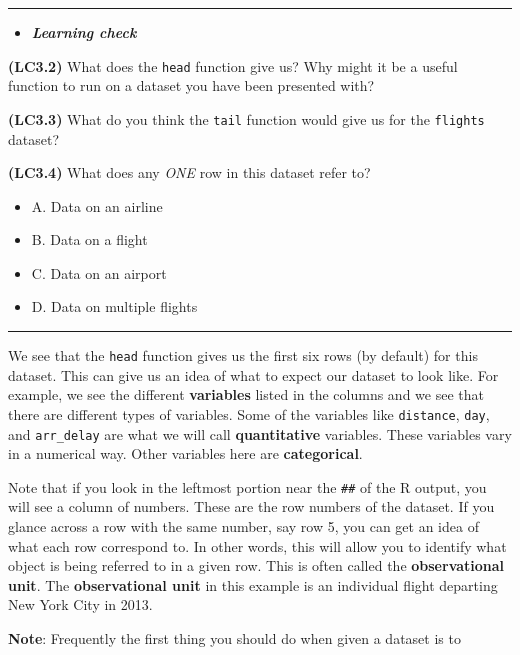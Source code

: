 \documentclass[]{tufte-book}
\providecommand{\tightlist}{%
  \setlength{\itemsep}{0pt}\setlength{\parskip}{0pt}}
\newenvironment{rmdblock}[1]
  {\begin{shaded*}
  \begin{itemize}
  \renewcommand{\labelitemi}{
    \raisebox{-.7\height}[0pt][0pt]{
    }
  }
  \item
  }
  {
  \end{itemize}
  \end{shaded*}
  }
\newenvironment{learncheck}
  {\begin{rmdblock}{warning}}
  {\end{rmdblock}}
\begin{document}
\begin{center}\rule{0.5\linewidth}{\linethickness}\end{center}

\begin{learncheck}
\textbf{\emph{Learning check}}
\end{learncheck}

\textbf{(LC3.2)} What does the \texttt{head} function give us? Why might
it be a useful function to run on a dataset you have been presented
with?

\textbf{(LC3.3)} What do you think the \texttt{tail} function would give
us for the \texttt{flights} dataset?

\textbf{(LC3.4)} What does any \emph{ONE} row in this dataset refer to?

\begin{itemize}
\tightlist
\item
  A. Data on an airline
\item
  B. Data on a flight
\item
  C. Data on an airport
\item
  D. Data on multiple flights
\end{itemize}

\begin{center}\rule{0.5\linewidth}{\linethickness}\end{center}

We see that the \texttt{head} function gives us the first six rows (by
default) for this dataset. This can give us an idea of what to expect
our dataset to look like. For example, we see the different
\textbf{variables} listed in the columns and we see that there are
different types of variables. Some of the variables like
\texttt{distance}, \texttt{day}, and \texttt{arr\_delay} are what we
will call \textbf{quantitative} variables. These variables vary in a
numerical way. Other variables here are \textbf{categorical}.

Note that if you look in the leftmost portion near the \texttt{\#\#} of
the R output, you will see a column of numbers. These are the row
numbers of the dataset. If you glance across a row with the same number,
say row 5, you can get an idea of what each row correspond to. In other
words, this will allow you to identify what object is being referred to
in a given row. This is often called the \textbf{observational unit}.
The \textbf{observational unit} in this example is an individual flight
departing New York City in 2013.

\textbf{Note}: Frequently the first thing you should do when given a
dataset is to
\end{document}
